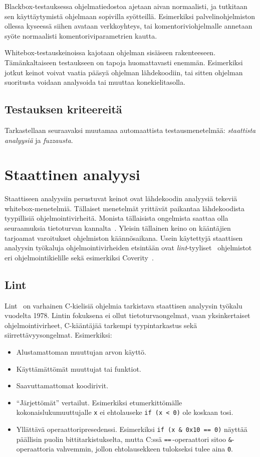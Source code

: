 Blackbox-testauksessa ohjelmatiedostoa ajetaan aivan normaalisti,
ja tutkitaan sen käyttäytymistä ohjelmaan sopivilla syötteillä.
Esimerkiksi palvelinohjelmiston ollessa kyseessä siihen avataan verkkoyhteys,
tai komentoriviohjelmalle annetaan syöte normaalisti komentoriviparametrien kautta.

Whitebox-testauskeinoissa kajotaan ohjelman sisäiseen rakenteeseen.
Tä\-män\-kal\-tai\-seen testaukseen on tapoja huomattavasti enemmän.
Esimerkiksi jotkut keinot voivat vaatia pääsyä ohjelman lähdekoodiin,
tai sitten ohjelman suoritusta voidaan analysoida tai muuttaa konekielitasolla.

\subsection{Testauksen kriteereitä}

Tarkastellaan seuraavaksi muutamaa automaattista testausmenetelmää: \emph{staattista analyysiä} ja \emph{fuzzausta}.

\section{Staattinen analyysi}

Staattiseen analyysiin perustuvat keinot ovat lähdekoodin analyysiä tekeviä whitebox-menetelmiä.
Tällaiset menetelmät yrittävät paikantaa lähdekoodista tyypillisiä ohjelmointivirheitä.
Monista tällaisista ongelmista saattaa olla seuraamuksia tietoturvan kannalta~\cite{StaticCodeAnalysis}.
Yleisin tällainen keino on kääntäjien tarjoamat varoitukset ohjelmiston käännösaikana.
Usein käytettyjä staattisen analyysin työkaluja ohjelmointivirheiden etsintään
ovat \emph{lint}-tyyliset~\cite{Lint} ohjelmistot eri ohjelmointikielille sekä
esimerkiksi Coverity~\cite{Coverity}.

\subsection{Lint}

Lint~\cite{Lint} on varhainen C-kielisiä ohjelmia tarkistava staattisen analyysin työkalu vuodelta 1978.
Lintin fokuksena ei ollut tietoturvaongelmat,
vaan yksinkertaiset ohjelmointivirheet, C-kääntäjää tarkempi tyypintarkastus sekä siirrettävyysongelmat.
Esimerkiksi:

\begin{itemize}
    \item Alustamattoman muuttujan arvon käyttö.
    \item Käyttämättömät muuttujat tai funktiot.
    \item Saavuttamattomat koodirivit.
    \item ``Järjettömät'' vertailut.
           Esimerkiksi etumerkittömälle kokonaislukumuuttujalle \texttt{x} ei ehtolauseke
           \texttt{if (x < 0)} ole koskaan tosi.
   \item Yllättävä operaattoripresedenssi.
         Esimerkiksi \texttt{if (x \& 0x10 == 0)} näyttää päällisin puolin bittitarkistukselta,
         mutta C:ssä \texttt{==}\,-operaattori sitoo \texttt{\&}-operaattoria vahvemmin,
         jollon ehtolausekkeen tulokseksi tulee aina \texttt{0}.
\end{itemize}

